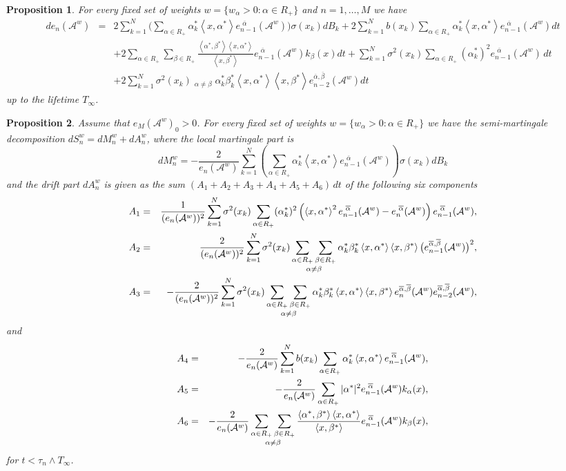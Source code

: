 \documentclass[10pt,a4paper]{amsart}
\newtheorem{proposition}{Proposition}
\newcommand{\Aa}{\mathcal{A}^{w}}
\newcommand{\SaR}{\sum_{\alpha\in R_+}}
\newcommand{\SabR}{\sum_{\alpha\in R_+}\sum_{\beta\in R_+}}
\newcommand{\SanbR}{\mathop{\sum_{\aR}\sum_{\bR}}_{\alpha\neq \beta}}
\newcommand{\aR}{\alpha\in R_+}
\newcommand{\abs}{\left<\alpha^*,\beta^*\right>}
\newcommand{\bR}{\beta\in R_+}
\newcommand{\eA}[1]{e_{#1}(\Aa)}
\newcommand{\eaA}[1]{e_{#1}^{\shift\overline{\alpha}}(\Aa)}
\newcommand{\eabA}[1]{e_{#1}^{\overline{\alpha}, \overline{\beta}}(\Aa)}
\newcommand{\lifetime}{T_\infty}
\newcommand{\shift}{\,\,}
\newcommand{\xas}{\left<x,\alpha^*\right>}
\newcommand{\xbs}{\left<x,\beta^*\right>}
\begin{document}
\begin{proposition}
	\label{prop:eA:SDE}
	For every fixed set of weights $w = \{w_\alpha>0: \alpha\in R_+\}$ and $n=1,\ldots,M$ we have
	\begin{eqnarray*}
	d\eA{n} &=& 2\sum_{k=1}^N\bigg(\sum_{\aR} \alpha_k^* \xas \eaA{n-1}\bigg)\sigma(x_k)dB_k+2\sum_{k=1}^N b(x_k)\sum_{\aR}\alpha_k^* \xas \eaA{n-1}dt\\
	&&+ 2\SabR \frac{\abs\xas}{\xbs} \eaA{n-1}k_\beta(x)dt+\sum_{k=1}^N\sigma^2(x_k)\sum_{\aR}(\alpha_k^*)^2\eaA{n-1}\,dt\\
	&&+ 2\sum_{k=1}^N \sigma^2(x_k)\SanbR \alpha_k^*\beta_k^* \xas \xbs \eabA{n-2} dt
\end{eqnarray*}
up to the lifetime $\lifetime$.
\end{proposition}

\begin{proposition}
    \label{prop:Sn:SDE}
    Assume that $\eA{M}_0>0$. For every fixed set of weights $w = \{w_\alpha>0: \alpha\in R_+\}$ we have the semi-martingale decomposition $dS_n^w = dM_n^w+dA_n^w$, where the local martingale part is
    \begin{equation*}
	dM_n^w = -\dfrac{2}{\eA{n}}\sum_{k=1}^N\left(\sum_{\aR} \alpha_k^* \xas \eaA{n-1}\right)\sigma(x_k)dB_k
    \end{equation*}
 and the drift part $dA_n^w$ is given as the sum $(A_1+A_2+A_3+A_4+A_5+A_6)\,dt$ of the following six components 
    \begin{eqnarray}
        \label{S:A1:form}
	A_1 &=& \frac{1}{(\eA{n})^2}\sum_{k=1}^N \sigma^2(x_k)\SaR (\alpha_k^*)^2  \left(\xas^2\eaA{n-1}-\eaA{n}\right)\eaA{n-1}\/,\\
        \label{S:A2:form}
        A_2 &=& \frac{2}{(\eA{n})^2}\sum_{k=1}^N \sigma^2(x_k)\SanbR \alpha_k^* \beta_k^* \xas\xbs\big(\eabA{n-1}\big)^2\/,\\
        \label{S:A3:form}
        A_3 &=& -\frac{2}{(\eA{n})^2}\sum_{k=1}^N \sigma^2(x_k)\SanbR \alpha_k^* \beta_k^* \xas\xbs\eabA{n}\eabA{n-2}\/,
     \end{eqnarray}  
     and
     \begin{eqnarray}
	\label{S:A4:form}
        A_4 &=& - \frac{2}{\eA{n}}\sum_{k=1}^N b(x_k)\sum_{\aR}\alpha_k^* \xas \eaA{n-1}\/,\\
        \label{S:A5:form}
	A_5 &=&  - \frac{2}{\eA{n}}\sum_{\aR} |\alpha^*|^2\eaA{n-1}k_\alpha(x)\/,\\
        \label{S:A6:form}
	A_6 &=&  	- \frac{2}{\eA{n}}	\SanbR \frac{\abs\xas}{\xbs} \eaA{n-1}k_\beta(x)\/,	
    \end{eqnarray}
    for $t<\tau_n \wedge \lifetime$.
\end{proposition}
\end{document}
